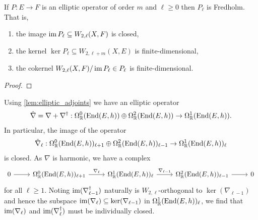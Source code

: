 \documentclass[12pt]{ociamthesis}  %
\begin{document}
\begin{theorem}\label{thm:fredholm_extension}
  If $P : E\to F$ is an elliptic operator of order $m$ and $\ell\geq 0$
  then $P_\ell$ is Fredholm. That is,
  \begin{enumerate}
    \item the image $\operatorname{im} P_\ell \subseteq W_{2,\ell}(X,F)$ is closed,
    \item the kernel $\ker P_\ell \subseteq W_{2,\ell+m}(X,E)$ is finite-dimensional,
    \item the cokernel $W_{2,\ell}(X,F)/\operatorname{im} P_\ell\in P_\ell$ is finite-dimensional.
  \end{enumerate}
  \begin{proof}
    \missingproof
  \end{proof}
\end{theorem}

\begin{example}\label{ex:nabla_hat_elliptic}
  Using \ref{lem:elliptic_adjoints} we have an elliptic operator
  \begin{align*}
    \hat\nabla = \nabla + \nabla^\dagger :
    \Omega^0_{\mathbb R}(\operatorname{End}(E,h)) \oplus
    \Omega^2_{\mathbb R}(\operatorname{End}(E,h)) \to
    \Omega^1_{\mathbb R}(\operatorname{End}(E,h)).
  \end{align*}
  In particular, the image of the operator
  \begin{align*}
    \hat\nabla_\ell :
    \Omega^0_{\mathbb R}(\operatorname{End}(E,h))_{\ell+1}
    \oplus \Omega^2_{\mathbb R}(\operatorname{End}(E,h))_{\ell-1}
    \to \Omega^1_{\mathbb R}(\operatorname{End}(E,h))_\ell
  \end{align*}
  is closed. As $\nabla$ is harmonic, we have a complex 
  \begin{equation*}
    \begin{tikzcd}
      0 & {\Omega^0_{\mathbb R}(\End(E,h))_{\ell+1}} & {\Omega^1_{\mathbb R}(\End(E,h))_\ell} & {\Omega^2_{\mathbb R}(\End(E,h))_{\ell-1}} & 0
      \arrow[from=1-1, to=1-2]
      \arrow["{\nabla_\ell}", from=1-2, to=1-3]
      \arrow["{\nabla_{\ell-1}}", from=1-3, to=1-4]
      \arrow[from=1-4, to=1-5]
    \end{tikzcd}
  \end{equation*}
  for all $\ell\geq 1$.  Noting $\operatorname{im}(\nabla_{\ell-1}^\dagger)$
  naturally is $W_{2,\ell}$-orthogonal to $\ker(\nabla_{\ell-1})$
  and hence the subspace $\operatorname{im}(\nabla_{\ell})\subseteq\ker(\nabla_{\ell-1})$
  in $\Omega^1_{\mathbb R}(\operatorname{End}(E,h))_\ell$, we find that
  $\operatorname{im}(\nabla_\ell)$ and $\operatorname{im}(\nabla_\ell^\dagger)$ must be individually
  closed.
\end{example}
\end{document}
